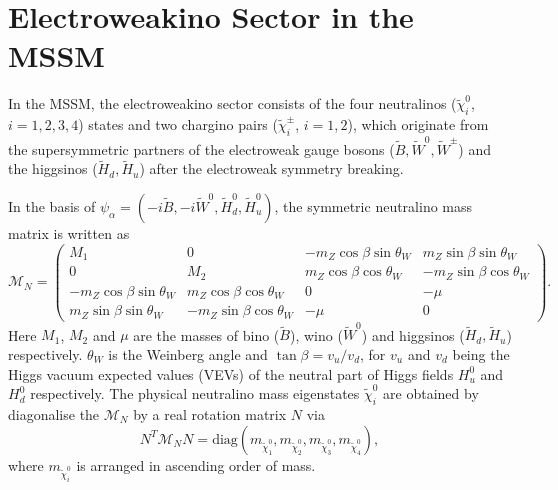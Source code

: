 \documentclass[letterpaper,11pt]{article}
\begin{document}
\section{Electroweakino Sector in the MSSM}
\label{sec:model}
In the MSSM, the electroweakino sector consists of the four neutralinos ($\tilde{\chi}^0_i$, $i=1,2,3,4$) states and two chargino pairs ($\tilde{\chi}^\pm_i$, $i=1,2$), which originate from the supersymmetric partners of the electroweak gauge bosons ($\tilde{B}, \tilde{W}^0, \tilde{W}^\pm$) and the higgsinos ($\tilde{H}_d, \tilde{H}_u$) after the electroweak symmetry breaking. 
\par In the basis of $\psi_\alpha = (-i\tilde{B}, -i\tilde{W}^0, \tilde{H}_d^0, \tilde{H}_u^0)$, the symmetric neutralino mass matrix is written as 
\begin{equation}\label{eq:massmatrix0}
\mathcal{M}_N =
	\begin{pmatrix}
	M_1 & 0 & -m_Z \cos{\beta} \sin{\theta_W} & m_Z \sin{\beta} \sin{\theta_W} \\
	0 & M_2 & m_Z \cos{\beta} \cos{\theta_W} & -m_Z \sin{\beta} \cos{\theta_W} \\
	-m_Z \cos{\beta} \sin{\theta_W} & m_Z \cos{\beta} \cos{\theta_W} & 0 & -\mu \\
	m_Z \sin{\beta} \sin{\theta_W} & -m_Z \sin{\beta} \cos{\theta_W} & -\mu & 0
	\end{pmatrix}.
\end{equation}
Here $M_1$, $M_2$ and $\mu$ are the masses of bino ($\tilde{B}$), wino ($\tilde{W}^0$) and higgsinos ($\tilde{H}_d, \tilde{H}_u$) respectively.  $\theta_W$ is the Weinberg angle and  $\tan\beta = v_u / v_d$, for $v_u$ and $v_d$ being the Higgs vacuum expected values (VEVs) of the neutral part of Higgs fields $H_u^0$ and $H_d^0$ respectively. 
The physical neutralino mass eigenstates $\tilde{\chi}_i^0$ are obtained by diagonalise the $\mathcal{M}_N$ by a real rotation matrix $N$ via 
\begin{equation}
N^T \mathcal{M}_N N = \text{diag}(m_{\tilde{\chi}^0_1}, m_{\tilde{\chi}^0_2}, m_{\tilde{\chi}^0_3}, m_{\tilde{\chi}^0_4}),
\end{equation}
where $m_{\tilde{\chi}_i^0}$ is arranged in ascending order of mass. 
\end{document}
